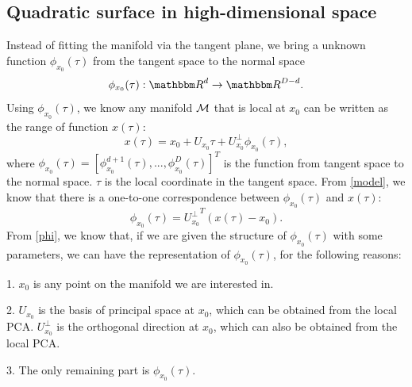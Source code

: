 \documentclass{article}
\theoremstyle{remark}
\begin{document}
\subsection{Quadratic surface in high-dimensional space }

 Instead of fitting the manifold via the tangent plane, we bring a unknown function $\phi_{x_0}(\tau)$ from the tangent space to the normal space
 \[
 \phi_{x_0}(\tau): {\mathbbm R}^d \rightarrow {\mathbbm R}^{D-d}.
 \] 
 Using  $\phi_{x_0}(\tau)$, we know any manifold $\cal M$ that is local at $x_0$ can be written as the range of  function  $x(\tau)$:
  \begin{equation}\label{model}
  x (\tau)=  x_0 + U_{x_0} \tau+ U_{x_0}^{\perp} \phi_{x_0} (\tau),
  \end{equation}
where $\phi_{x_0}(\tau)=[\phi_{x_0}^{d+1}(\tau),...,\phi_{x_0}^{D}(\tau)]^T$  is the function from tangent space to the normal space. $\tau$ is the local coordinate in the tangent space.
From \eqref{model}, we know that there is a one-to-one correspondence between $\phi_{x_0} (\tau)$ and $x(\tau)$: %
\begin{equation}\label{phi}
\phi_{x_0}(\tau) = {U_{x_0}^{\perp}}^{T}(x(\tau)-x_0).
\end{equation}
From \eqref{phi}, we know that, if we are given the structure of $\phi_{x_0}(\tau)$ with some parameters, we can have the representation of $\phi_{x_0}(\tau)$, for the following reasons:

1. $x_0$ is any point on the manifold we are interested in.

2.  $U_{x_0}$ is the basis of principal space at $x_0$, which can be obtained from the local PCA. $U_{x_0}^{\perp}$ is the orthogonal direction at $x_0$, which can also be obtained from the local PCA.

3. The only remaining part is  $\phi_{x_0} (\tau)$.
\end{document}
